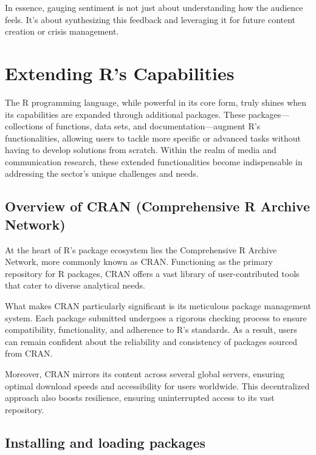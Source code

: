 \documentclass[
  b5paper]{book}
\begin{document}
In essence, gauging sentiment is not just about understanding how the audience feels. It's about synthesizing this feedback and leveraging it for future content creation or crisis management.

\hypertarget{extending-rs-capabilities}{%
\section{Extending R's Capabilities}\label{extending-rs-capabilities}}

The R programming language, while powerful in its core form, truly shines when its capabilities are expanded through additional packages. These packages---collections of functions, data sets, and documentation---augment R's functionalities, allowing users to tackle more specific or advanced tasks without having to develop solutions from scratch. Within the realm of media and communication research, these extended functionalities become indispensable in addressing the sector's unique challenges and needs.

\hypertarget{overview-of-cran-comprehensive-r-archive-network}{%
\subsection*{Overview of CRAN (Comprehensive R Archive Network)}\label{overview-of-cran-comprehensive-r-archive-network}}

At the heart of R's package ecosystem lies the Comprehensive R Archive Network, more commonly known as CRAN. Functioning as the primary repository for R packages, CRAN offers a vast library of user-contributed tools that cater to diverse analytical needs.

What makes CRAN particularly significant is its meticulous package management system. Each package submitted undergoes a rigorous checking process to ensure compatibility, functionality, and adherence to R's standards. As a result, users can remain confident about the reliability and consistency of packages sourced from CRAN.

Moreover, CRAN mirrors its content across several global servers, ensuring optimal download speeds and accessibility for users worldwide. This decentralized approach also boosts resilience, ensuring uninterrupted access to its vast repository.

\hypertarget{installing-and-loading-packages}{%
\subsection*{Installing and loading packages}\label{installing-and-loading-packages}}
\end{document}
